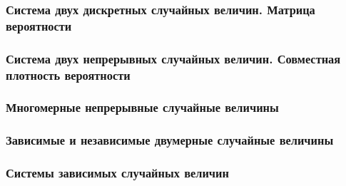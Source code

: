 \documentclass[a4paper]{article}
\begin{document}
            \subsubsection{Система двух дискретных случайных величин. Матрица вероятности}

            \subsubsection{Система двух непрерывных случайных величин. Совместная плотность вероятности}

            \subsubsection{Многомерные непрерывные случайные величины}

            \subsubsection{Зависимые и независимые двумерные случайные величины}

            \subsubsection{Системы зависимых случайных величин}
\end{document}
